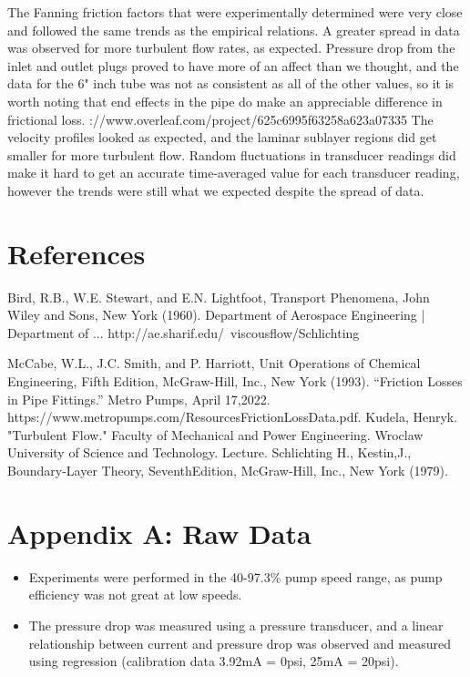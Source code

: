\documentclass{article}
\begin{document}
The Fanning friction factors that were experimentally determined were very close and followed the same trends as the empirical relations. A greater spread in data was observed for more turbulent flow rates, as expected. Pressure drop from the inlet and outlet plugs proved to have more of an affect than we thought, and the data for the 6" inch tube was not as consistent as all of the other values, so it is worth noting that end effects in the pipe do make an appreciable difference in frictional loss. \linebreak
\linebreakhttps://www.overleaf.com/project/625c6995f63258a623a07335
The velocity profiles looked as expected, and the laminar sublayer regions did get smaller for more turbulent flow. Random fluctuations in transducer readings did make it hard to get an accurate time-averaged value for each transducer reading, however the trends were still what we expected despite the spread of data. 

\section*{References}

Bird, R.B., W.E. Stewart, and E.N. Lightfoot, Transport Phenomena, John Wiley and Sons, New York (1960).
\linebreak
\linebreak 
Department of Aerospace Engineering | Department of ... http://ae.sharif.edu/~viscousflow/Schlichting%
\linebreak
\linebreak

McCabe, W.L., J.C. Smith, and P. Harriott, Unit Operations of Chemical Engineering, Fifth Edition, McGraw-Hill, Inc., New York (1993).
\linebreak
\linebreak 
“Friction Losses in Pipe Fittings.” Metro Pumps, April 17,2022. https://www.metropumps.com/ResourcesFrictionLossData.pdf. 
\linebreak 
\linebreak 
Kudela, Henryk. "Turbulent Flow." Faculty of Mechanical and Power Engineering. Wroclaw University of Science and Technology. Lecture.   
\linebreak
\linebreak
Schlichting H., Kestin,J., Boundary-Layer Theory, SeventhEdition, McGraw-Hill, Inc., New York (1979).  

\centering \section*{Appendix A: Raw Data} \raggedright
\begin{itemize}
\item Experiments were performed in the 40-97.3\% pump speed range, as pump efficiency was not great at low speeds.
\item The pressure drop was measured using a pressure transducer, and a linear relationship between current and pressure drop was observed and measured using regression (calibration data 3.92mA = 0psi, 25mA = 20psi).
\end{itemize}
\end{document}
